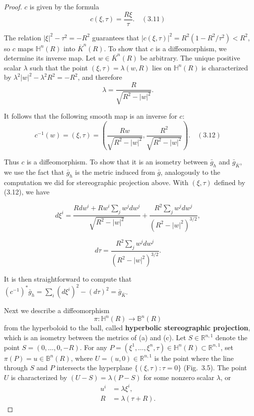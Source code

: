 \begin{proof}

$c$ is given by the formula
\[
c(\xi, \tau) = \frac{R\xi}{\tau}. \quad (3.11)
\]

The relation $|\xi|^2 - \tau^2 = -R^2$ guarantees that $|c(\xi, \tau)|^2 = R^2(1 - R^2/\tau^2) < R^2$, so $c$ maps $\mathbb{H}^n(R)$ into $\overline{K}^n(R)$. To show that $c$ is a diffeomorphism, we determine its inverse map. Let $w \in \overline{K}^n(R)$ be arbitrary. The unique positive scalar $\lambda$ such that the point $(\xi, \tau) = \lambda(w, R)$ lies on $\mathbb{H}^n(R)$ is characterized by $\lambda^2|w|^2 - \lambda^2 R^2 = -R^2$, and therefore
\[
\lambda = \frac{R}{\sqrt{R^2 - |w|^2}}.
\]

It follows that the following smooth map is an inverse for $c$:
\[
c^{-1}(w) = (\xi, \tau) = \left( \frac{Rw}{\sqrt{R^2 - |w|^2}}, \frac{R^2}{\sqrt{R^2 - |w|^2}} \right). \quad (3.12)
\]

Thus $c$ is a diffeomorphism. To show that it is an isometry between $\bar{g}_h$ and $\bar{g}_{\bar{K}}$, we use the fact that $\bar{g}_h$ is the metric induced from $\bar{g}$, analogously to the computation we did for stereographic projection above. With $(\xi, \tau)$ defined by (3.12), we have

\[
d\xi^i = \frac{R dw^i + Rw^i \sum_j w^j dw^j}{\sqrt{R^2 - |w|^2}} + \frac{R^2 \sum_j w^j dw^j}{(R^2 - |w|^2)^{3/2}},
\]

\[
d\tau = \frac{R^2 \sum_j w^j dw^j}{(R^2 - |w|^2)^{3/2}}.
\]

It is then straightforward to compute that $(c^{-1})^* \bar{g}_h = \sum_i (d\xi^i)^2 - (d\tau)^2 = \bar{g}_{\bar{K}}$.


Next we describe a diffeomorphism
\[
\pi : \mathbb{H}^n(R) \to \mathbb{B}^n(R)
\]
from the hyperboloid to the ball, called \textbf{hyperbolic stereographic projection}, which is an isometry between the metrics of (a) and (c). Let $S \in \mathbb{R}^{n,1}$ denote the point $S = (0,\ldots,0,-R)$. For any $P = (\xi^1,\ldots,\xi^n,\tau) \in \mathbb{H}^n(R) \subset \mathbb{R}^{n,1}$, set $\pi(P) = u \in \mathbb{B}^n(R)$, where $U = (u,0) \in \mathbb{R}^{n,1}$ is the point where the line through $S$ and $P$ intersects the hyperplane $\{(\xi,\tau) : \tau = 0\}$ (Fig.\ 3.5). The point $U$ is characterized by $(U - S) = \lambda(P - S)$ for some nonzero scalar $\lambda$, or
\begin{align}
u^i &= \lambda\xi^i, \label{eq:3.13a} \\
R &= \lambda(\tau + R). \label{eq:3.13b}
\end{align}


\end{proof}

